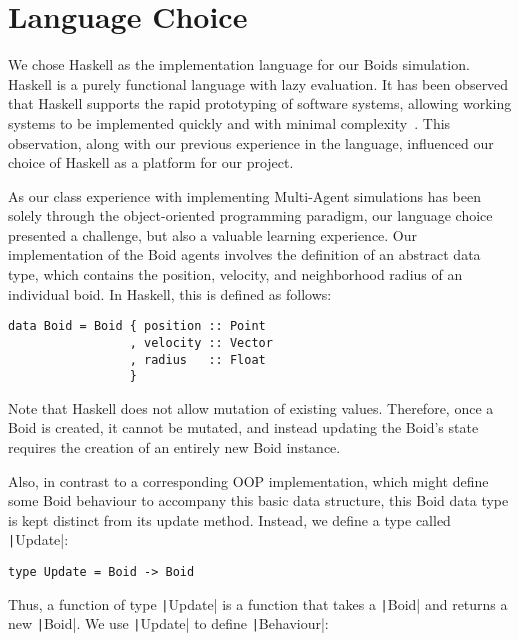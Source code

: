 

\MYHEADERS{}

\section{Language Choice}

We chose Haskell as the implementation language for our Boids simulation.
Haskell is a purely functional language with lazy evaluation. It has been observed that Haskell supports the rapid prototyping of software systems, allowing working systems to be implemented quickly and with minimal complexity~\cite{hudak1994haskell}. This observation, along with our previous experience in the language, influenced our choice of Haskell as a platform for our project.

As our class experience with implementing Multi-Agent simulations has been solely through the object-oriented programming paradigm, our language choice presented a challenge, but also a valuable learning experience. Our
implementation of the Boid agents involves the definition of an abstract data
type, which contains the position, velocity, and neighborhood radius of an
individual boid. In Haskell, this is defined as follows:

\begin{verbatim}
data Boid = Boid { position :: Point
                 , velocity :: Vector
                 , radius   :: Float
                 }
\end{verbatim}

Note that Haskell does not allow mutation of existing values. Therefore, once a
Boid is created, it cannot be mutated, and instead updating the Boid's state
requires the creation of an entirely new Boid instance.

Also, in contrast to a corresponding OOP implementation, which might define some Boid behaviour to accompany this basic data structure, this Boid data type is kept distinct from its update method. Instead, we define a type called \texttt|Update|:

\begin{verbatim}
type Update = Boid -> Boid
\end{verbatim}

Thus, a function of type \texttt|Update| is a function that takes a \texttt|Boid| and returns
a new \texttt|Boid|. We use \texttt|Update| to define \texttt|Behaviour|:

